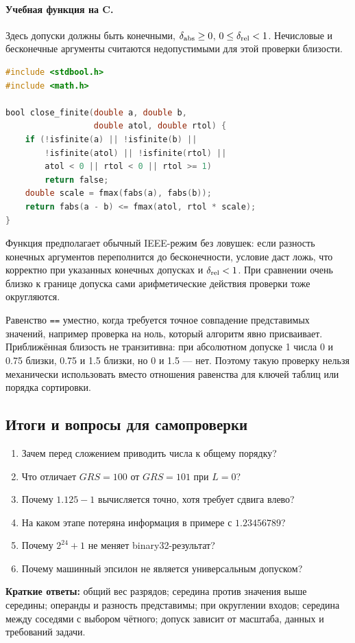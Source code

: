 \paragraph{Учебная функция на C.}
Здесь допуски должны быть конечными, $\delta_{\rm abs}\ge0$,
$0\le\delta_{\rm rel}<1$. Нечисловые и бесконечные аргументы
считаются недопустимыми для этой проверки близости.
\begin{lstlisting}[language=C,basicstyle=\ttfamily\small]
#include <stdbool.h>
#include <math.h>

bool close_finite(double a, double b,
                  double atol, double rtol) {
    if (!isfinite(a) || !isfinite(b) ||
        !isfinite(atol) || !isfinite(rtol) ||
        atol < 0 || rtol < 0 || rtol >= 1)
        return false;
    double scale = fmax(fabs(a), fabs(b));
    return fabs(a - b) <= fmax(atol, rtol * scale);
}
\end{lstlisting}
Функция предполагает обычный IEEE-режим без ловушек: если разность
конечных аргументов переполнится до бесконечности, условие даст ложь,
что корректно при указанных конечных допусках и $\delta_{\rm rel}<1$.
При сравнении очень близко к границе допуска сами арифметические
действия проверки тоже округляются.

Равенство \texttt{==} уместно, когда требуется точное совпадение
представимых значений, например проверка на ноль, который алгоритм
явно присваивает. Приближённая близость не транзитивна: при абсолютном
допуске 1 числа 0 и 0.75 близки, 0.75 и 1.5 близки, но 0 и 1.5 --- нет.
Поэтому такую проверку нельзя механически использовать вместо отношения
равенства для ключей таблиц или порядка сортировки.

\subsection*{Итоги и вопросы для самопроверки}
\begin{enumerate}
    \item Зачем перед сложением приводить числа к общему порядку?
    \item Что отличает $GRS=100$ от $GRS=101$ при $L=0$?
    \item Почему $1.125-1$ вычисляется точно, хотя требует сдвига влево?
    \item На каком этапе потеряна информация в примере с $1.23456789$?
    \item Почему $2^{24}+1$ не меняет binary32-результат?
    \item Почему машинный эпсилон не является универсальным допуском?
\end{enumerate}
\textbf{Краткие ответы:} общий вес разрядов; середина против значения
выше середины; операнды и разность представимы; при округлении входов;
середина между соседями с выбором чётного; допуск зависит от масштаба,
данных и требований задачи.

